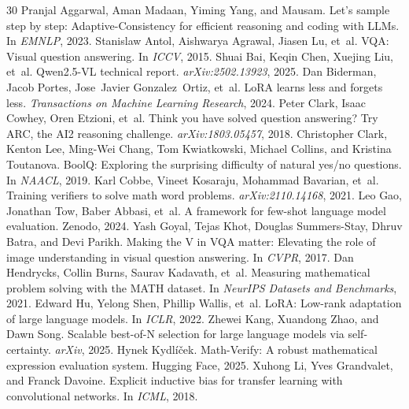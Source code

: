 \documentclass{article}
\begin{document}
\small
\begin{thebibliography}{30}
Pranjal Aggarwal, Aman Madaan, Yiming Yang, and Mausam. Let's sample step by step: Adaptive-Consistency for efficient reasoning and coding with LLMs. In \emph{EMNLP}, 2023.
Stanislaw Antol, Aishwarya Agrawal, Jiasen Lu, et~al. VQA: Visual question answering. In \emph{ICCV}, 2015.
Shuai Bai, Keqin Chen, Xuejing Liu, et~al. Qwen2.5-VL technical report. \emph{arXiv:2502.13923}, 2025.
Dan Biderman, Jacob Portes, Jose~Javier Gonzalez~Ortiz, et~al. LoRA learns less and forgets less. \emph{Transactions on Machine Learning Research}, 2024.
Peter Clark, Isaac Cowhey, Oren Etzioni, et~al. Think you have solved question answering? Try ARC, the AI2 reasoning challenge. \emph{arXiv:1803.05457}, 2018.
Christopher Clark, Kenton Lee, Ming-Wei Chang, Tom Kwiatkowski, Michael Collins, and Kristina Toutanova. BoolQ: Exploring the surprising difficulty of natural yes/no questions. In \emph{NAACL}, 2019.
Karl Cobbe, Vineet Kosaraju, Mohammad Bavarian, et~al. Training verifiers to solve math word problems. \emph{arXiv:2110.14168}, 2021.
Leo Gao, Jonathan Tow, Baber Abbasi, et~al. A framework for few-shot language model evaluation. Zenodo, 2024.
Yash Goyal, Tejas Khot, Douglas Summers-Stay, Dhruv Batra, and Devi Parikh. Making the V in VQA matter: Elevating the role of image understanding in visual question answering. In \emph{CVPR}, 2017.
Dan Hendrycks, Collin Burns, Saurav Kadavath, et~al. Measuring mathematical problem solving with the MATH dataset. In \emph{NeurIPS Datasets and Benchmarks}, 2021.
Edward Hu, Yelong Shen, Phillip Wallis, et~al. LoRA: Low-rank adaptation of large language models. In \emph{ICLR}, 2022.
Zhewei Kang, Xuandong Zhao, and Dawn Song. Scalable best-of-N selection for large language models via self-certainty. \emph{arXiv}, 2025.
Hynek Kydl{\'i}{\v{c}}ek. Math-Verify: A robust mathematical expression evaluation system. Hugging Face, 2025.
Xuhong Li, Yves Grandvalet, and Franck Davoine. Explicit inductive bias for transfer learning with convolutional networks. In \emph{ICML}, 2018.

\end{thebibliography}
\end{document}
